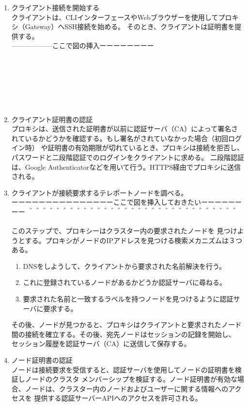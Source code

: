 \documentclass[12pt,a4paper,titlepage]{jreport}
\begin{document}
\begin{enumerate}[1:]

    \item クライアント接続を開始する\mbox{}\\クライアントは、CLIインターフェースやWebブラウザーを使用してプロキシ（Gateway）へSSH接続を始める。
    そのとき、クライアントは証明書を提供する。\\
    ------------------ここで図の挿入ーーーーーーーー\\\\\\\\\\\\\\

    \item クライアント証明書の認証\mbox{}\\
    プロキシは、送信された証明書が以前に認証サーバ（CA）によって署名されているかどうかを確認する。もし署名がされていなかった場合（初回ログイン時）
    や証明書の有効期限が切れているとき、プロキシは接続を拒否し、パスワードと二段階認証でのログインをクライアントに求める。
    二段階認証は、Google Authenticatorなどを用いて行う。HTTPS経由でプロキシに送信される。
    
    \item クライアントが接続要求するテレポートノードを調べる。\mbox{}\\
    ーーーーーーーーーーーーーーーここで図を挿入しておきたいーーーーーーーー
    ＾＾＾＾＾＾＾＾＾＾＾＾＾＾＾＾＾＾＾＾＾＾＾＾＾＾＾＾＾＾＾\\\\


    このステップで、プロキシーはクラスター内の要求されたノードを
    見つけようとする。プロキシがノードのIPアドレスを見つける検索メカニズムは３つある。
    \begin{enumerate}[(1)]
        \item DNSをしようして、クライアントから要求された名前解決を行う。
        \item これに登録されているノードがあるかどうか認証サーバに尋ねる。
        \item 要求された名前と一致するラベルを持つノードを見つけるように認証サーバに要求する。
    \end{enumerate}
    その後、ノードが見つかると、プロキシはクライアントと要求されたノード間の接続を確立する。その後、宛先ノードはセッションの記録を開始し、
    セッション履歴を認証サーバ（CA）に送信して保存する。
    \item ノード証明書の認証\mbox{}\\ノードは接続要求を受信すると、認証サーバを使用してノードの証明書を検証しノードのクラスタ
    メンバーシップを検証する。ノード証明書が有効な場合、ノードは、クラスター内のノードおよびユーザーに関する情報へのアクセスを
    提供する認証サーバーAPIへのアクセスを許可される。


\end{enumerate}
\end{document}
